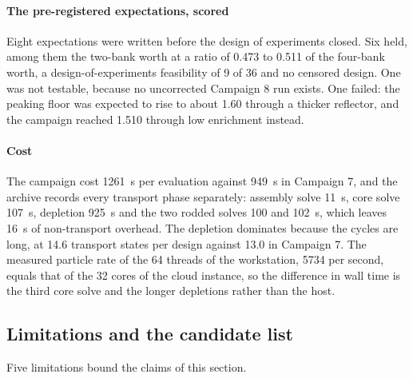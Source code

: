 \paragraph{The pre-registered expectations, scored}
\label{sec:res-c8-hyp}

Eight expectations were written before the design of experiments
closed. Six held, among them the two-bank worth at a ratio of 0.473 to
0.511 of the four-bank worth, a design-of-experiments feasibility of 9
of 36 and no censored design. One was not testable, because no
uncorrected Campaign 8 run exists. One failed: the peaking floor was
expected to rise to about 1.60 through a thicker reflector, and the
campaign reached 1.510 through low enrichment instead.

\paragraph{Cost}
\label{sec:res-c8-cost}

The campaign cost \SI{1261}{s} per evaluation against \SI{949}{s} in
Campaign 7, and the archive records every transport phase separately:
assembly solve \SI{11}{s}, core solve \SI{107}{s}, depletion
\SI{925}{s} and the two rodded solves \num{100} and \SI{102}{s}, which
leaves \SI{16}{s} of non-transport overhead. The depletion dominates
because the cycles are long, at 14.6 transport states per design
against 13.0 in Campaign 7. The measured particle rate of the 64
threads of the workstation, \num{5734} per second, equals that of the
32 cores of the cloud instance, so the difference in wall time is the
third core solve and the longer depletions rather than the host.

\subsection{Limitations and the candidate list}
\label{sec:res-c8-limits}

Five limitations bound the claims of this section.

